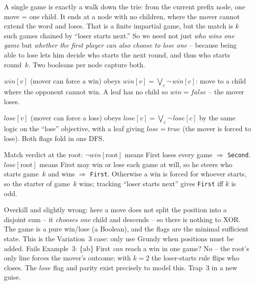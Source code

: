 A single game is exactly a walk down the trie: from the current prefix node, one move =
one child. It ends at a node with no children, where the mover cannot extend the word and
loses. That is a finite impartial game, but the match is \emph{$k$} such games chained by
``loser starts next.'' So we need not just \emph{who wins one game} but \emph{whether the
first player can also choose to lose one} -- because being able to lose lets him decide who
starts the next round, and thus who starts round~$k$. Two booleans per node capture both.

\begin{observation}
$\mathit{win}[v]$ (mover can force a win) obeys $\mathit{win}[v] = \bigvee_{c}
\neg\,\mathit{win}[c]$: move to a child where the opponent cannot win. A leaf has no child
so $\mathit{win}=\mathit{false}$ -- the mover loses.
\end{observation}
\begin{observation}
$\mathit{lose}[v]$ (mover can force a loss) obeys $\mathit{lose}[v] = \bigvee_{c}
\neg\,\mathit{lose}[c]$ by the same logic on the ``lose'' objective, with a leaf giving
$\mathit{lose}=\mathit{true}$ (the mover is forced to lose). Both flags fold in one DFS.
\end{observation}
\begin{observation}
Match verdict at the root: $\neg\mathit{win}[\text{root}]$ means First loses every game
$\Rightarrow$ \texttt{Second}. $\mathit{lose}[\text{root}]$ means First may win or lose each
game at will, so he steers who starts game~$k$ and wins $\Rightarrow$ \texttt{First}.
Otherwise a win is forced for whoever starts, so the starter of game~$k$ wins; tracking
``loser starts next'' gives \texttt{First} iff $k$ is odd.
\end{observation}

\begin{thinkbox}
{Overkill and slightly wrong: here a move does not split the position into a disjoint
sum -- it \emph{chooses one} child and descends -- so there is nothing to XOR. The game is
a pure win/lose (a Boolean), and the flags are the minimal sufficient state. This is the
Variation~3 case: only use Grundy when positions must be added.}
{Fails Example~3: \{ab\} First \emph{can} reach a win in one game? No -- the root's only
line forces the mover's outcome; with $k=2$ the loser-starts rule flips who closes. The
$\mathit{lose}$ flag and parity exist precisely to model this. Trap~3 in a new guise.}
\end{thinkbox}

